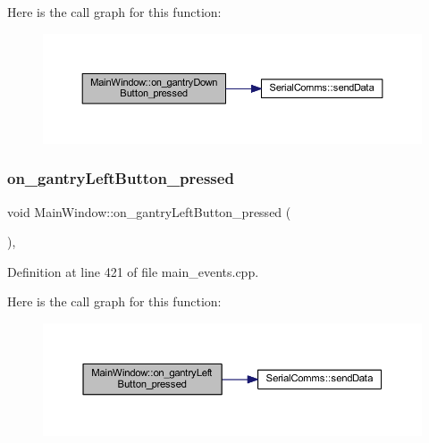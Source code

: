 Here is the call graph for this function\+:
\nopagebreak
\begin{figure}[H]
\begin{center}
\leavevmode
\includegraphics[width=350pt]{class_main_window_a04c1e4428230f33e991ff87aed62575f_cgraph}
\end{center}
\end{figure}
\mbox{\label{class_main_window_a116f8869b68f5d57afe1849fd1f0f0f7}} 
\subsubsection{\texorpdfstring{on\_gantryLeftButton\_pressed}{on\_gantryLeftButton\_pressed}}
{\footnotesize\ttfamily void Main\+Window\+::on\+\_\+gantry\+Left\+Button\+\_\+pressed (\begin{DoxyParamCaption}{ }\end{DoxyParamCaption})\hspace{0.3cm}{\ttfamily [private]}, {\ttfamily [slot]}}



Definition at line 421 of file main\+\_\+events.\+cpp.

Here is the call graph for this function\+:
\nopagebreak
\begin{figure}[H]
\begin{center}
\leavevmode
\includegraphics[width=350pt]{class_main_window_a116f8869b68f5d57afe1849fd1f0f0f7_cgraph}
\end{center}
\end{figure}
\mbox{\label{class_main_window_a2456f40cbc5747391f01b61c59edd6dd}} 
